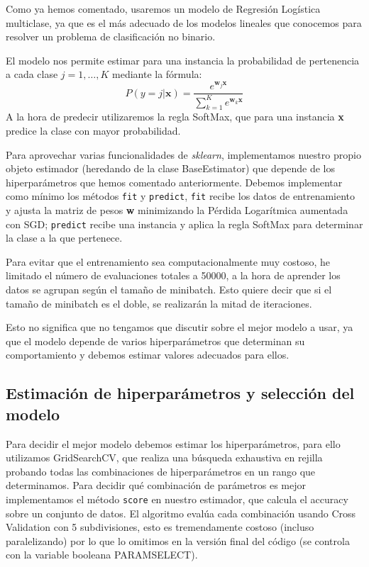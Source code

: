 \documentclass[a4]{article}
\begin{document}
Como ya hemos comentado, usaremos un modelo de Regresión Logística
multiclase, ya que es el más adecuado de los modelos lineales que
conocemos para resolver un problema de clasificación no binario.

El modelo nos permite estimar para una instancia la probabilidad de
pertenencia a cada clase $j=1,\ldots,K$ mediante la fórmula:
\[P(y=j|\textbf{x})=\frac{e^{\textbf{w}_j \textbf{x}}}{\sum_{k=1}^K
    e^{\textbf{w}_k \textbf{x}}}\] A la hora de predecir utilizaremos
la regla SoftMax, que para una instancia \textbf{x} predice la
clase con mayor probabilidad.

Para aprovechar varias funcionalidades de \textit{sklearn},
implementamos nuestro propio objeto estimador (heredando de la clase
BaseEstimator) que depende de los hiperparámetros que hemos comentado
anteriormente. Debemos implementar como mínimo los métodos
\texttt{fit} y \texttt{predict}, \texttt{fit} recibe los datos de
entrenamiento y ajusta la matriz de pesos \textbf{w} minimizando la
Pérdida Logarítmica aumentada con SGD; \texttt{predict} recibe una
instancia y aplica la regla SoftMax para determinar la clase a la que
pertenece.

Para evitar que el entrenamiento sea computacionalmente muy costoso,
he limitado el número de evaluaciones totales a 50000, a la hora de
aprender los datos se agrupan según el tamaño de minibatch. Esto
quiere decir que si el tamaño de minibatch es el doble, se realizarán
la mitad de iteraciones.

Esto no significa que no tengamos que discutir sobre el mejor modelo a
usar, ya que el modelo depende de varios hiperparámetros que
determinan su comportamiento y debemos estimar valores adecuados para
ellos.

\subsection{Estimación de hiperparámetros y selección del modelo}

Para decidir el mejor modelo debemos estimar los hiperparámetros, para
ello utilizamos GridSearchCV, que realiza una búsqueda exhaustiva en
rejilla probando todas las combinaciones de hiperparámetros en un
rango que determinamos. Para decidir qué combinación de parámetros es
mejor implementamos el método \texttt{score} en nuestro estimador, que
calcula el accuracy sobre un conjunto de datos. El algoritmo evalúa
cada combinación usando Cross Validation con 5 subdivisiones, esto es
tremendamente costoso (incluso paralelizando) por lo que lo omitimos
en la versión final del código (se controla con la variable booleana
PARAMSELECT).
\end{document}
